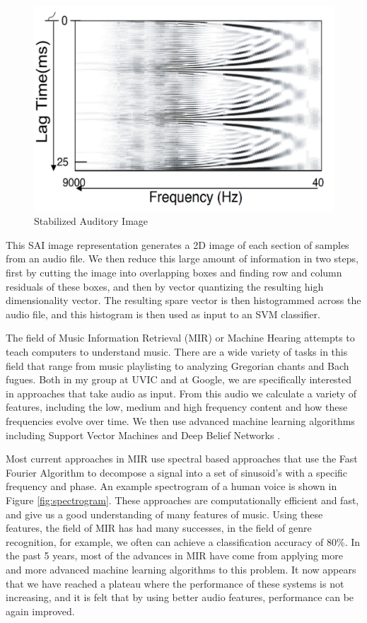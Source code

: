 \documentclass[12pt,oneside]{book}
\begin{document}
\begin{figure}[here]
\includegraphics[width=150mm]{figures/sai}
\caption{Stabilized Auditory Image \label{fig:sai}}
\end{figure}

This SAI image representation generates a 2D image of each section of
samples from an audio file.  We then reduce this large amount of
information in two steps, first by cutting the image into overlapping
boxes and finding row and column residuals of these boxes, and then by
vector quantizing the resulting high dimensionality vector.  The
resulting spare vector is then histogrammed across the audio file, and
this histogram is then used as input to an SVM \cite{yh05}
classifier\cite{chapelle2006}.

The field of Music Information Retrieval (MIR) or Machine Hearing
\cite{marsyas} attempts to teach computers to understand music.  There
are a wide variety of tasks in this field that range from music
playlisting to analyzing Gregorian chants and Bach fugues.  Both in my
group at UVIC and at Google, we are specifically interested in
approaches that take audio as input.  From this audio we calculate a
variety of features, including the low, medium and high frequency
content and how these frequencies evolve over time.  We then use
advanced machine learning algorithms including Support Vector Machines
and Deep Belief Networks \cite{bengio2007}.

Most current approaches in MIR use spectral based approaches that use
the Fast Fourier Algorithm to decompose a signal into a set of
sinusoid's with a specific frequency and phase.  An example
spectrogram of a human voice is shown in Figure \ref{fig:spectrogram}.
These approaches are computationally efficient and fast, and give us a
good understanding of many features of music.  Using these features,
the field of MIR has had many successes, in the field of genre
recognition, for example, we often can achieve a classification
accuracy of 80\%.  In the past 5 years, most of the advances in MIR
have come from applying more and more advanced machine learning
algorithms to this problem.  It now appears that we have reached a
plateau where the performance of these systems is not increasing, and
it is felt that by using better audio features, performance can be
again improved.
\end{document}
